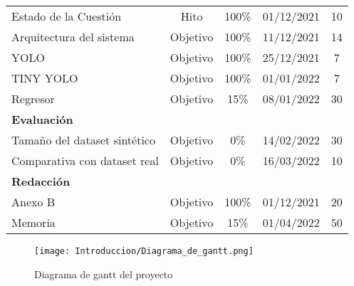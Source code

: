 \begin{table}[htbp]
\begin{tabular}{p{16.5em}cccc}
    \rowcolor[rgb]{ .949,  .949,  .949} Estado de la Cuestión & Hito  & 100\% & 01/12/2021 & 10  \\
    Arquitectura del sistema & Objetivo & 100\% & 11/12/2021 & 14  \\
    \rowcolor[rgb]{ .949,  .949,  .949} YOLO & Objetivo & 100\% & 25/12/2021 & 7  \\
    TINY YOLO & Objetivo & 100\% & 01/01/2022 & 7  \\
    \rowcolor[rgb]{ .949,  .949,  .949} Regresor & Objetivo & 15\% & 08/01/2022 & 30  \\
    \textbf{Evaluación} &       &       &       &  \\
    \rowcolor[rgb]{ .949,  .949,  .949} Tamaño del dataset sintético & Objetivo & 0\% & 14/02/2022 & 30  \\
    Comparativa con dataset real & Objetivo & 0\% & 16/03/2022 & 10  \\
    \rowcolor[rgb]{ .949,  .949,  .949} \textbf{Redacción} &       &       &       &  \\
    Anexo B & Objetivo & 100\% & 01/12/2021 & 20  \\
    \rowcolor[rgb]{ .949,  .949,  .949} Memoria & Objetivo & 15\% & 01/04/2022 & 50  \\
    \end{tabular}%
  \label{chap:Introducción tab:plan}%
\end{table}%

\begin{figure}[ht]
	\centering
	\texttt{[image: Introduccion/Diagrama\_de\_gantt.png]}
	\caption{Diagrama de gantt del proyecto}
	\label{chap:Introducción fig:Gantt}
	\vspace{-5pt}
\end{figure}